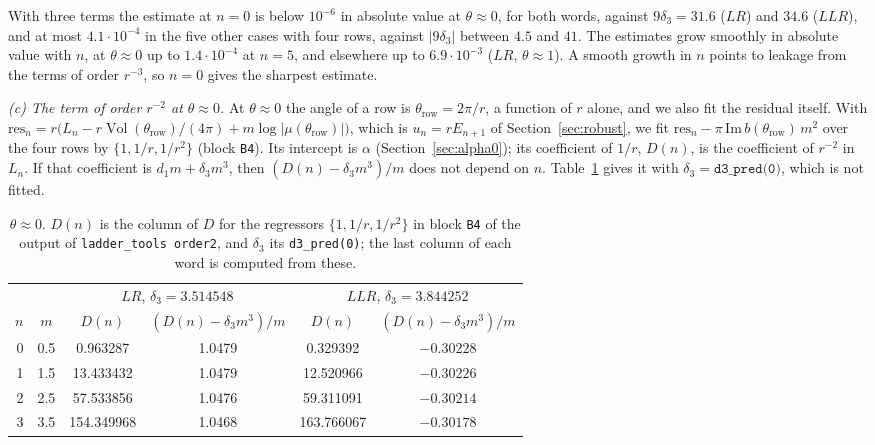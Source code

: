 \documentclass[11pt]{amsart}
\theoremstyle{definition}
\theoremstyle{remark}
\newcommand{\Vol}{\operatorname{Vol}}
\begin{document}
With three terms the estimate at $n = 0$ is below $10^{-6}$ in absolute value at
$\theta \approx 0$, for both words, against $9\delta_3 = 31.6$ ($LR$) and $34.6$
($LLR$), and at most $4.1\cdot10^{-4}$ in the five other cases with four rows, against
$|9\delta_3|$ between $4.5$ and $41$. The estimates grow smoothly in absolute value with
$n$, at $\theta \approx 0$ up to $1.4\cdot10^{-4}$ at $n = 5$, and elsewhere up to
$6.9\cdot10^{-3}$ ($LR$, $\theta \approx 1$). A smooth growth in $n$ points to leakage
from the terms of order $r^{-3}$, so $n = 0$ gives the sharpest estimate.

\emph{(c) The term of order $r^{-2}$ at $\theta \approx 0$.} At $\theta \approx 0$ the
angle of a row is $\theta_{\mathrm{row}} = 2\pi/r$, a function of $r$ alone, and we
also fit the residual itself. With $\mathrm{res}_n = r\big(L_n -
r\Vol(\theta_{\mathrm{row}})/(4\pi) + m\log|\mu(\theta_{\mathrm{row}})|\big)$, which is
$u_n = rE_{n+1}$ of Section~\ref{sec:robust}, we fit
$\mathrm{res}_n - \pi\,\mathrm{Im}\,b(\theta_{\mathrm{row}})\,m^2$ over the four rows by
$\{1, 1/r, 1/r^2\}$ (block \texttt{B4}). Its intercept is $\alpha$
(Section~\ref{sec:alpha0}); its coefficient of $1/r$, $D(n)$, is the coefficient of
$r^{-2}$ in $L_n$. If that coefficient is $d_1m + \delta_3m^3$, then
$(D(n) - \delta_3m^3)/m$ does not depend on $n$. Table~\ref{tab:order2c} gives it with
$\delta_3 = \texttt{d3\_pred(0)}$, which is not fitted.

\begin{table}[ht]
\centering
\begin{tabular}{rccccc}
\toprule
& & \multicolumn{2}{c}{$LR$, $\delta_3 = 3.514548$} & \multicolumn{2}{c}{$LLR$, $\delta_3 = 3.844252$} \\
$n$ & $m$ & $D(n)$ & $(D(n) - \delta_3m^3)/m$ & $D(n)$ & $(D(n) - \delta_3m^3)/m$ \\
\midrule
0 & 0.5 & 0.963287  & 1.0479 & 0.329392  & $-0.30228$ \\
1 & 1.5 & 13.433432 & 1.0479 & 12.520966 & $-0.30226$ \\
2 & 2.5 & 57.533856 & 1.0476 & 59.311091 & $-0.30214$ \\
3 & 3.5 & 154.349968 & 1.0468 & 163.766067 & $-0.30178$ \\
\bottomrule
\end{tabular}
\caption{$\theta \approx 0$. $D(n)$ is the column of $D$ for the regressors
$\{1, 1/r, 1/r^2\}$ in block \texttt{B4} of the output of \texttt{ladder\_tools order2}, and $\delta_3$ its
\texttt{d3\_pred(0)}; the last column of each word is computed from these.}
\label{tab:order2c}
\end{table}
\end{document}
